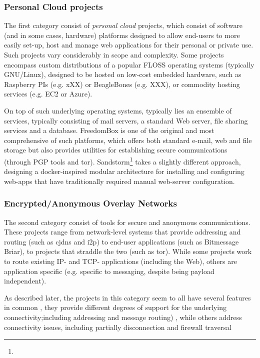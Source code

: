 \documentclass{article}
\begin{document}
{{\subsubsection{Personal Cloud projects}

The first category consist of \emph{personal cloud} projects, which consist of software (and in some cases, hardware) platforms designed to allow end-users to more easily set-up, host and manage web applications for their personal or private use.  Such projects vary considerably in scope and complexity. Some projects encompass custom distributions of a popular FLOSS operating systems (typically GNU/Linux), designed to be hosted on low-cost embedded hardware, such as Raspberry PIs (e.g. xXX) or BeagleBones (e.g. XXX), or commodity hosting services (e.g. EC2 or Azure). 

On top of such underlying operating systems, typically lies an ensemble of services, typically consisting of mail servers, a standard Web server, file sharing services and a database. FreedomBox is one of the original and most comprehensive of such platforms, which offers both standard e-mail, web and file storage but also provides utilities for establishing secure communications (through PGP tools and tor).  Sandstorm\footnote{} takes a slightly different approach, designing a docker-inspired modular architecture for installing and configuring web-apps that have traditionally required manual web-server configuration. 

\subsubsection{Encrypted/Anonymous Overlay Networks}

The second category consist of tools for secure and anonymous communications.  These projects range from network-level systems that provide addressing and routing (such as cjdns and i2p) to end-user applications (such as Bitmessage Briar), to projects that straddle the two (such as tor). While some projects work to route existing IP- and TCP- applications (including the Web), others are application specific (e.g. specific to messaging, despite being payload independent).

As described later, the projects in this category seem to all have several features in common , they provide different degrees of support for the underlying connectivity;including addressing and message routing) , while others address connectivity issues, including partially disconnection and firewall traversal

}}
\end{document}
